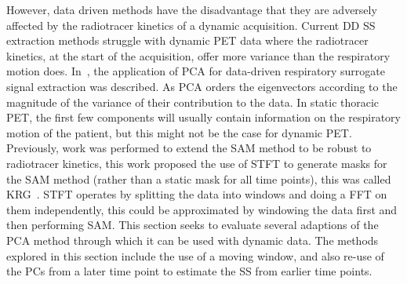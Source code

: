             However, data driven methods have the disadvantage that they are adversely affected by the radiotracer kinetics of a dynamic acquisition. Current \gls{DD} \gls{SS} extraction methods struggle with dynamic \gls{PET} data where the radiotracer kinetics, at the start of the acquisition, offer more variance than the respiratory motion does. In~, the application of \gls{PCA} for data-driven respiratory surrogate signal extraction was described. As \gls{PCA} orders the eigenvectors according to the magnitude of the variance of their contribution to the data. In static thoracic \gls{PET}, the first few components will usually contain information on the respiratory motion of the patient, but this might not be the case for dynamic \gls{PET}. Previously, work was performed to extend the \gls{SAM} method to be robust to radiotracer kinetics, this work proposed the use of \gls{STFT} to generate masks for the \gls{SAM} method (rather than a static mask for all time points), this was called \gls{KRG}~\parencite{Schleyer2014}. \gls{STFT} operates by splitting the data into windows and doing a \gls{FFT} on them independently, this could be approximated by windowing the data first and then performing \gls{SAM}. This section seeks to evaluate several adaptions of the \gls{PCA} method through which it can be used with dynamic data. The methods explored in this section include the use of a moving window, and also re-use of the \glspl{PC} from a later time point to estimate the \gls{SS} from earlier time points.
        
